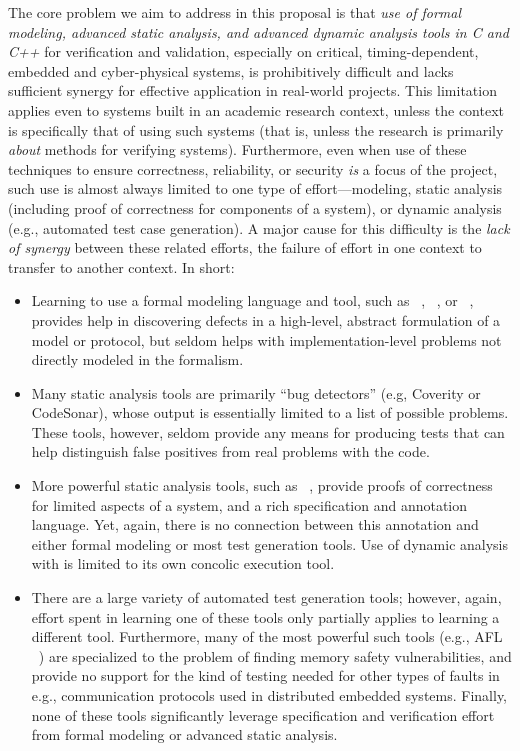 The core problem we aim to address in this proposal is that \emph{use of formal modeling, advanced static analysis, and advanced dynamic analysis tools in C and C++} for verification and validation, especially on critical, timing-dependent, embedded and cyber-physical systems, is prohibitively difficult and lacks sufficient synergy for effective application in real-world projects.  This limitation applies even to systems built in an academic research context, unless the context is specifically that of using such systems (that is, unless the research is primarily \emph{about} methods for verifying systems).  Furthermore, even when use of these techniques to ensure correctness, reliability, or security \emph{is} a focus of the project, such use is almost always limited to one type of effort---modeling, static analysis (including proof of correctness for components of a system), or dynamic analysis (e.g., automated test case generation).  A major cause for this difficulty is the \emph{lack of synergy} between these related efforts, the failure of effort in one context to transfer to another context.  In short:

\begin{itemize}[labelsep=3pt,leftmargin=12pt]
\item Learning to use a formal modeling language and tool, such as \uppaal~\cite{uppaal}, \prism~\cite{KNP2011:CAV}, or \spin~\cite{SPIN}, provides help in discovering defects in a high-level, abstract formulation of a model or protocol, but seldom helps with implementation-level problems not directly modeled in the formalism.
\item Many static analysis tools are primarily ``bug detectors'' (e.g, Coverity or CodeSonar), whose output is essentially limited to a list of possible problems.  These tools, however, seldom provide any means for producing tests that can help distinguish false positives from real problems with the code.
\item More powerful static analysis tools, such as \framac~\cite{KKP2015:FAC}, provide proofs of correctness for limited aspects of a system, and a rich specification and annotation language.  Yet, again, there is no connection between this annotation and either formal modeling or most test generation tools.  Use of dynamic analysis with \framac is limited to its own concolic execution tool.
\item There are a large variety of automated test generation tools; however, again, effort spent in learning one of these tools only partially applies to learning a different tool.  Furthermore, many of the most powerful such tools (e.g., AFL ~\cite{aflfuzz}) are specialized to the problem of finding memory safety vulnerabilities, and provide no support for  the kind of testing needed for  other types of faults in e.g., communication protocols used in distributed embedded systems.  Finally, none of these tools significantly leverage specification and verification effort from formal modeling or advanced static analysis.
\end{itemize}

